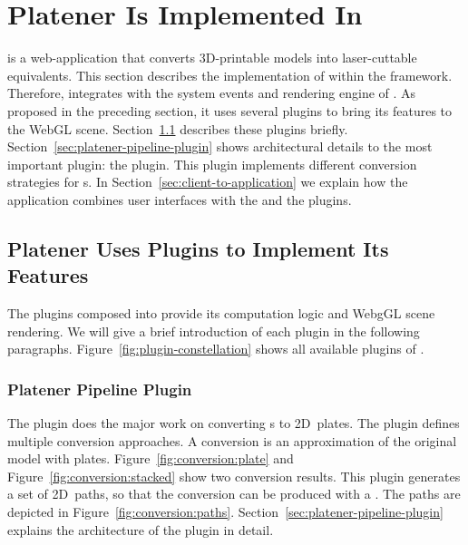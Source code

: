 \documentclass[../../ClassicThesis.tex]{subfiles}
\begin{document}
\section{Platener Is Implemented In {\convertify}}
\label{sec:application-platener}


{\platener} is a web-application that converts 3D-printable
models into laser-cuttable equivalents. This section
describes the implementation of {\platener} within the
{\convertify} framework. Therefore, {\platener} integrates
with the system events and rendering engine of
{\convertify}. As proposed in the preceding section, it uses
several plugins to bring its features to the WebGL
scene. Section~\ref{sec:platener-uses-plugins} describes
these plugins briefly.
Section~\ref{sec:platener-pipeline-plugin} shows
architectural details to the most important plugin:
the  plugin. This plugin
implements different conversion strategies for
{\threedmodel}s. In Section~\ref{sec:client-to-application}
we explain how the application combines user interfaces with
the  and the plugins.

\subsection{Platener Uses Plugins to Implement Its Features}
\label{sec:platener-uses-plugins}

The plugins composed into {\platener} provide its computation
logic and WebgGL scene rendering. We will give a brief introduction of
each plugin in the following paragraphs.
Figure~\ref{fig:plugin-constellation} shows all available plugins of
{\platener}.

\subsubsection{Platener Pipeline Plugin}

The  plugin does the major work on
converting {\threedmodel}s to 2D~plates. The plugin defines
multiple conversion approaches. A conversion is an
approximation of the original model with plates.
Figure~\ref{fig:conversion:plate} and
Figure~\ref{fig:conversion:stacked} show two conversion
results. This plugin generates a set of 2D~paths, so that
the conversion can be produced with a {\lasercutter}. The
paths are depicted in Figure~\ref{fig:conversion:paths}.
Section~\ref{sec:platener-pipeline-plugin} explains the
architecture of the  plugin in
detail.
\end{document}
